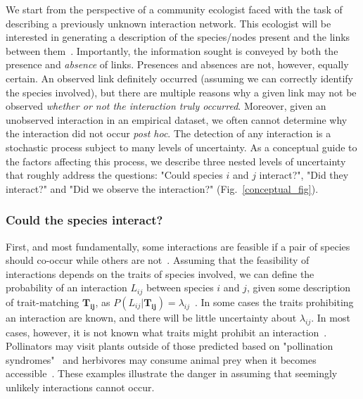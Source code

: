 \documentclass[12pt]{article}
\begin{document}
\begin{spacing}{2.0}
      We start from the perspective of a community ecologist faced with the task of describing a previously unknown interaction network. This ecologist will be interested in generating a description of the species/nodes present and the links between them~\citep{Roslin2016}.  Importantly, the information sought is conveyed by both the presence and \emph{absence} of links. Presences and absences are not, however, equally certain. An observed link definitely occurred (assuming we can correctly identify the species involved), but there are multiple reasons why a given link may not be observed \emph{whether or not the interaction truly occurred}. Moreover, given an unobserved interaction in an empirical dataset, we often cannot determine why the interaction did not occur \emph{post hoc}. The detection of any interaction is a stochastic process subject to many levels of uncertainty. As a conceptual guide to the factors affecting this process, we describe three nested levels of uncertainty that roughly address the questions: "Could species $i$ and $j$ interact?", "Did they interact?" and "Did we observe the interaction?" (Fig.~\ref{conceptual_fig}). 


        \subsubsection*{Could the species interact?} 

          First, and most fundamentally, some interactions are feasible if a pair of species should co-occur while others are not~\citep{Poisot2015}. Assuming that the feasibility of interactions depends on the traits of species involved, we can define the probability of an interaction $L_{ij}$ between species $i$ and $j$, given some description of trait-matching $\mathbf{T_{ij}}$, as $P(L_{ij}|\mathbf{T_{ij}}) = \lambda_{ij}$~\citep{Bartomeus2013,Gravel2013,Weinstein2017}. 
          In some cases the traits prohibiting an interaction are known, and there will be little uncertainty about $\lambda_{ij}$.
          In most cases, however, it is not known what traits might prohibit an interaction~\citep{Dormann2017}. Pollinators may visit plants outside of those predicted based on "pollination syndromes"~\citep{Weinstein2017a} and herbivores may consume animal prey when it becomes accessible~\citep{Furness1988,Pietz2000}. These examples illustrate the danger in assuming that seemingly unlikely interactions cannot occur.



\end{spacing}
\end{document}
